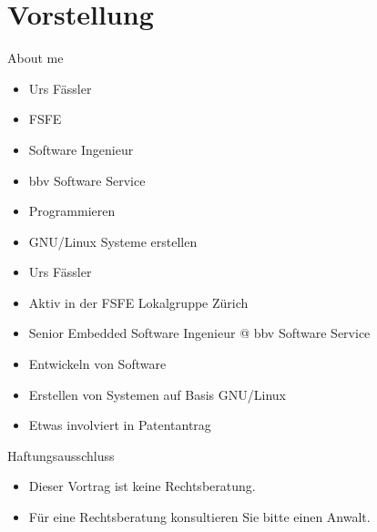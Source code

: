 
\section{Vorstellung}
\begin{frame}{About me}
	\begin{itemize}
		\item Urs Fässler
		\item FSFE
		\item Software Ingenieur
		\item bbv Software Service
		\item Programmieren
		\item GNU/Linux Systeme erstellen
	\end{itemize}
\end{frame}
\note
{
	\begin{itemize}
		\item Urs Fässler
		\item Aktiv in der FSFE Lokalgruppe Zürich
		\item Senior Embedded Software Ingenieur @ bbv Software Service
		\item Entwickeln von Software
		\item Erstellen von Systemen auf Basis GNU/Linux
		\item Etwas involviert in Patentantrag
	\end{itemize}
}

\begin{frame}{Haftungsausschluss}
	\begin{itemize}
		\item Dieser Vortrag ist keine Rechtsberatung.
		\item Für eine Rechtsberatung konsultieren Sie bitte einen Anwalt.
	\end{itemize}
\end{frame}
